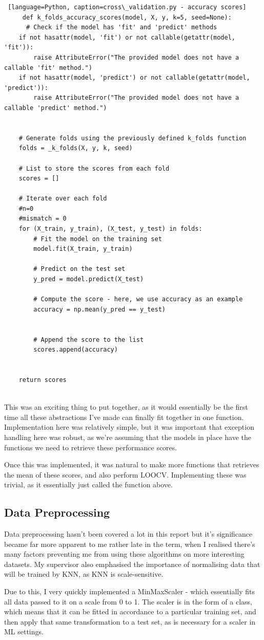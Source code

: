 \documentclass[letterpaper,10pt]{article}
\begin{document}
\begin{lstlisting} [language=Python, caption=cross\_validation.py - accuracy scores]
     def k_folds_accuracy_scores(model, X, y, k=5, seed=None):
      # Check if the model has 'fit' and 'predict' methods
    if not hasattr(model, 'fit') or not callable(getattr(model, 'fit')):
        raise AttributeError("The provided model does not have a callable 'fit' method.")
    if not hasattr(model, 'predict') or not callable(getattr(model, 'predict')):
        raise AttributeError("The provided model does not have a callable 'predict' method.")


    # Generate folds using the previously defined k_folds function
    folds = _k_folds(X, y, k, seed)

    # List to store the scores from each fold
    scores = []

    # Iterate over each fold
    #n=0
    #mismatch = 0
    for (X_train, y_train), (X_test, y_test) in folds:
        # Fit the model on the training set
        model.fit(X_train, y_train)

        # Predict on the test set
        y_pred = model.predict(X_test)

        # Compute the score - here, we use accuracy as an example
        accuracy = np.mean(y_pred == y_test)


        # Append the score to the list
        scores.append(accuracy)
       

    return scores
      
\end{lstlisting}
This was an exciting thing to put together, as it would essentially be the first time all these abstractions I've made can finally fit together in one function. Implementation here was relatively simple, but it was important that exception handling here was robust, as we're assuming that the models in place have the functions we need to retrieve these performance scores.  \par
Once this was implemented, it was natural to make more functions that retrieves the mean of these scores, and also perform LOOCV. Implementing these was trivial, as it essentially just called the function above. \par

\subsection{Data Preprocessing}
Data preprocessing hasn't been covered a lot in this report but it's significance became far more apparent to me rather late in the term, when I realised there's many factors preventing me from using these algorithms on more interesting datasets. My supervisor also emphasised the importance of normalising data that will be trained by KNN, as KNN is scale-sensitive. \par
Due to this, I very quickly implemented a MinMaxScaler - which essentially fits all data passed to it on a scale from 0 to 1. The scaler is in the form of a class, which means that it can be fitted in accordance to a particular training set, and then apply that same transformation to a test set, as is necessary for a scaler in ML settings. \par
\end{document}
